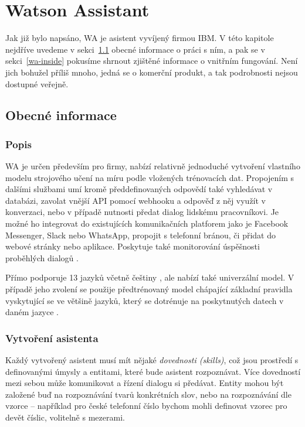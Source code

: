 \chapter{Watson Assistant}\label{chapter-wa}

Jak již bylo napsáno, WA je asistent vyvíjený firmou IBM.
V této kapitole nejdříve uvedeme v sekci~\ref{wa-common} obecné informace
o práci s ním, a pak se v sekci~\ref{wa-inside} pokusíme shrnout zjištěné
informace o vnitřním fungování.
Není jich bohužel příliš mnoho, jedná se o komerční produkt,
a tak podrobnosti nejsou dostupné veřejně.

\section{Obecné informace}\label{wa-common}

\subsection{Popis}

WA je určen především pro firmy, nabízí relativně jednoduché vytvoření
vlastního modelu strojového učení na míru podle vložených trénovacích
dat. Propojením s dalšími službami umí kromě předdefinovaných odpovědí
také vyhledávat v databázi, zavolat vnější API pomocí webhooku a odpověď
z něj využít v konverzaci, nebo v případě nutnosti předat dialog lidskému
pracovníkovi. Je možné ho integrovat do existujících komunikačních platforem
jako je Facebook Messenger, Slack nebo WhatsApp, propojit s telefonní
bránou, či přidat do webové stránky nebo aplikace. Poskytuje také monitorování
úspěšnosti proběhlých dialogů \citep{wa_about}.

Přímo podporuje 13 jazyků včetně
češtiny \citep{wa_languages}, ale nabízí také univerzální model. V případě
jeho zvolení se použije předtrénovaný model chápající základní pravidla
vyskytující se ve většině jazyků, který se dotrénuje na poskytnutých
datech v daném jazyce \citep{wa_universal_model}.

\subsection{Vytvoření asistenta}\label{wa-create}

Každý vytvořený asistent musí mít nějaké \textit{dovednosti (skills)},
což jsou prostředí s definovanými úmysly a entitami, které bude asistent
rozpoznávat. Více dovedností mezi sebou může komunikovat
a řízení dialogu si předávat. Entity mohou být založené buď na rozpoznávání tvarů
konkrétních slov, nebo na rozpoznávání dle vzorce -- například pro české telefonní
číslo bychom mohli definovat vzorec pro devět číslic, volitelně s mezerami.


